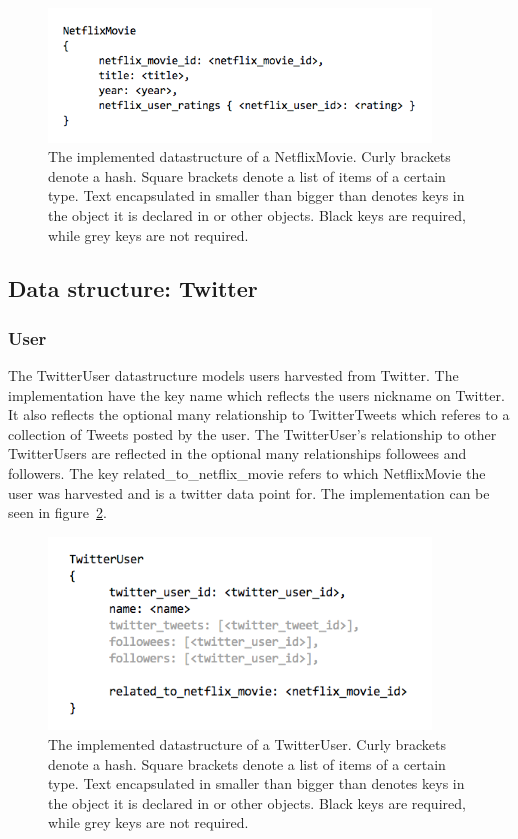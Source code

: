 	\begin{figure}[H]
	\includegraphics[width=4in]{image/datastructure-netflix-movie.png}
	\centering
	\caption{The implemented datastructure of a NetflixMovie. Curly brackets denote a hash. Square brackets denote a list of items of a certain type. Text encapsulated in smaller than bigger than denotes keys in the object it is declared in or other objects. Black keys are required, while grey keys are not required.}
	\label{figure:datastructure-netflix-movie}
	\end{figure}

\subsection{Data structure: Twitter}

\subsubsection{User}
The TwitterUser datastructure models users harvested from Twitter. The implementation have the key name which reflects the users nickname on Twitter. It also reflects the optional many relationship to TwitterTweets which referes to a collection of Tweets posted by the user. The TwitterUser's relationship to other TwitterUsers are reflected in the optional many relationships followees and followers. The key related\_to\_netflix\_movie refers to which NetflixMovie the user was harvested and is a twitter data point for. The implementation can be seen in figure~\ref{figure:datastructure-twitter-user}.

	\begin{figure}[H]
	\includegraphics[width=4in]{image/datastructure-twitter-user.png}
	\centering
	\caption{The implemented datastructure of a TwitterUser. Curly brackets denote a hash. Square brackets denote a list of items of a certain type. Text encapsulated in smaller than bigger than denotes keys in the object it is declared in or other objects. Black keys are required, while grey keys are not required.}
	\label{figure:datastructure-twitter-user}
	\end{figure}

